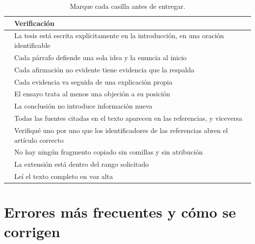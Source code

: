 \documentclass[12pt,a4paper,openany]{report}
\begin{document}
\begin{table}[htbp]
	\centering
	\caption{Marque cada casilla antes de entregar.}
	\label{tab:checklist}
	\small
	\begin{tabular}{C{1.2cm} L{12.6cm}}
		\toprule
		\textbf{} & \textbf{Verificaci\'on} \\
		\midrule
		\fbox{\phantom{x}} & La tesis est\'a escrita expl\'icitamente en la introducci\'on, en una oraci\'on identificable \\
		\fbox{\phantom{x}} & Cada p\'arrafo defiende una sola idea y la enuncia al inicio \\
		\fbox{\phantom{x}} & Cada afirmaci\'on no evidente tiene evidencia que la respalda \\
		\fbox{\phantom{x}} & Cada evidencia va seguida de una explicaci\'on propia \\
		\fbox{\phantom{x}} & El ensayo trata al menos una objeci\'on a su posici\'on \\
		\fbox{\phantom{x}} & La conclusi\'on no introduce informaci\'on nueva \\
		\fbox{\phantom{x}} & Todas las fuentes citadas en el texto aparecen en las referencias, y viceversa \\
		\fbox{\phantom{x}} & Verifiqu\'e uno por uno que los identificadores de las referencias abren el art\'iculo correcto \\
		\fbox{\phantom{x}} & No hay ning\'un fragmento copiado sin comillas y sin atribuci\'on \\
		\fbox{\phantom{x}} & La extensi\'on est\'a dentro del rango solicitado \\
		\fbox{\phantom{x}} & Le\'i el texto completo en voz alta \\
		\bottomrule
	\end{tabular}
\end{table}

\section{Errores m\'as frecuentes y c\'omo se corrigen}
\end{document}

